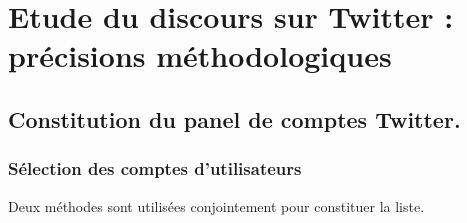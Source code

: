 %
%
%
%
%
%
%


\section{Etude du discours sur Twitter : précisions méthodologiques}

\subsection{Constitution du panel de comptes Twitter.}

\subsubsection{Sélection des comptes d’utilisateurs}

Deux méthodes sont utilisées conjointement pour constituer la liste.

